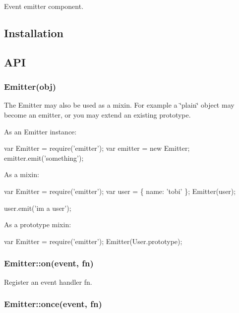Event emitter component.

\subsection*{Installation}




\subsection*{A\+PI}

\subsubsection*{Emitter(obj)}

The {\ttfamily Emitter} may also be used as a mixin. For example a \char`\"{}plain\char`\"{} object may become an emitter, or you may extend an existing prototype.

As an {\ttfamily Emitter} instance\+:


\begin{DoxyCode}
var Emitter = require('emitter');
var emitter = new Emitter;
emitter.emit('something');
\end{DoxyCode}


As a mixin\+:


\begin{DoxyCode}
var Emitter = require('emitter');
var user = \{ name: 'tobi' \};
Emitter(user);

user.emit('im a user');
\end{DoxyCode}


As a prototype mixin\+:


\begin{DoxyCode}
var Emitter = require('emitter');
Emitter(User.prototype);
\end{DoxyCode}


\subsubsection*{Emitter\+::on(event, fn)}

Register an {\ttfamily event} handler {\ttfamily fn}.

\subsubsection*{Emitter\+::once(event, fn)}

